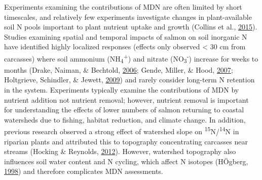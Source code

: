 \documentclass [11pt, proquest] {uwthesis}[2015/03/03]
\begin{document}
Experiments examining the contributions of MDN are often limited by
short timescales, and relatively few experiments investigate changes in
plant-available soil N pools important to plant nutrient uptake and
growth (Collins et al., \protect\hyperlink{ref-Collins2015}{2015}).
Studies examining spatial and temporal impacts of salmon on soil
inorganic N have identified highly localized responses (effects only
observed \textless{} 30 cm from carcasses) where soil ammonium
(NH\textsubscript{4}\textsuperscript{+}) and nitrate
(NO\textsubscript{3}\textsuperscript{-}) increase for weeks to months
(Drake, Naiman, \& Bechtold, \protect\hyperlink{ref-Drake2006}{2006};
Gende, Miller, \& Hood, \protect\hyperlink{ref-Gende2007}{2007};
Holtgrieve, Schindler, \& Jewett,
\protect\hyperlink{ref-Holtgrieve2009}{2009}) and rarely consider
long-term N retention in the system. Experiments typically examine the
contributions of MDN by nutrient addition not nutrient removal; however,
nutrient removal is important for understanding the effects of lower
numbers of salmon returning to coastal watersheds due to fishing,
habitat reduction, and climate change. In addition, previous research
observed a strong effect of watershed slope on
\textsuperscript{15}N/\textsuperscript{14}N in riparian plants and
attributed this to topography concentrating carcasses near streams
(Hocking \& Reynolds, \protect\hyperlink{ref-Hocking2012}{2012}).
However, watershed topography also influences soil water content and N
cycling, which affect N isotopes (HÖgberg,
\protect\hyperlink{ref-Hogberg1998}{1998}) and therefore complicates MDN
assessments.
\end{document}
